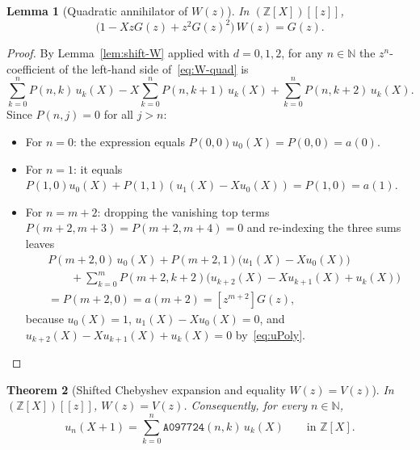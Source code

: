\documentclass[11pt]{article}
\newcommand{\llbracket}{[\![}
\newcommand{\rrbracket}{]\!]}
\newtheorem{theorem}{Theorem}[section]
\newtheorem{lemma}[theorem]{Lemma}
\theoremstyle{definition}
\newcommand{\N}{\mathbb{N}}
\newcommand{\Z}{\mathbb{Z}}
\newcommand{\seq}[1]{\texttt{#1}}
\begin{document}
\begin{lemma}[Quadratic annihilator of $W(z)$]
\label{lem:W-quad}
In $(\Z[X])\llbracket z \rrbracket$,
\begin{equation}
\label{eq:W-quad}
\bigl(1 - X z G(z) + z^2 G(z)^2\bigr)\,W(z) = G(z).
\end{equation}
\end{lemma}

\begin{proof}
By Lemma~\ref{lem:shift-W} applied with $d = 0, 1, 2$, for any $n \in \N$ the $z^n$-coefficient of the left-hand side of~\eqref{eq:W-quad} is
\[
\sum_{k=0}^{n} P(n, k)\,u_k(X) - X \sum_{k=0}^{n} P(n, k+1)\,u_k(X) + \sum_{k=0}^{n} P(n, k+2)\,u_k(X).
\]
Since $P(n, j) = 0$ for all $j > n$:
\begin{itemize}
\item For $n = 0$: the expression equals $P(0, 0) u_0(X) = P(0, 0) = a(0)$.
\item For $n = 1$: it equals $P(1, 0) u_0(X) + P(1, 1) (u_1(X) - X u_0(X)) = P(1, 0) = a(1)$.
\item For $n = m + 2$: dropping the vanishing top terms $P(m+2, m+3) = P(m+2, m+4) = 0$ and re-indexing the three sums leaves
\begin{align*}
&P(m+2, 0)\,u_0(X) + P(m+2, 1)\bigl(u_1(X) - X u_0(X)\bigr) \\
&\qquad + \sum_{k=0}^{m} P(m+2, k+2)\bigl(u_{k+2}(X) - X u_{k+1}(X) + u_k(X)\bigr) \\
&= P(m+2, 0) = a(m+2) = [z^{m+2}] G(z),
\end{align*}
because $u_0(X) = 1$, $u_1(X) - X u_0(X) = 0$, and $u_{k+2}(X) - X u_{k+1}(X) + u_k(X) = 0$ by~\eqref{eq:uPoly}. \qedhere
\end{itemize}
\end{proof}

\begin{theorem}[Shifted Chebyshev expansion and equality $W(z) = V(z)$]
\label{thm:W-eq-V}
In $(\Z[X])\llbracket z \rrbracket$, $W(z) = V(z)$. Consequently, for every $n \in \N$,
\begin{equation}
\label{eq:bala-identity}
u_n(X + 1) = \sum_{k=0}^{n} \seq{A097724}(n, k)\,u_k(X) \qquad \text{in } \Z[X].
\end{equation}
\end{theorem}
\end{document}
